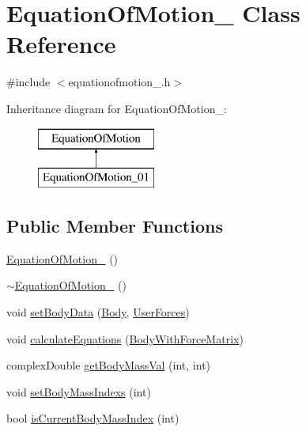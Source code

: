 \hypertarget{class_equation_of_motion__01}{\section{Equation\-Of\-Motion\-\_ Class Reference}
\label{class_equation_of_motion__01}
}


{\ttfamily \#include $<$equationofmotion\-\_.\-h$>$}

Inheritance diagram for Equation\-Of\-Motion\-\_\-:\begin{figure}[H]
\begin{center}
\leavevmode
\includegraphics[height=2.000000cm]{class_equation_of_motion__01}
\end{center}
\end{figure}
\subsection*{Public Member Functions}
\begin{DoxyCompactItemize}
\item 
\hyperlink{class_equation_of_motion__01_aeb61f23820f4598eece331449e34643f}{Equation\-Of\-Motion\-\_} ()
\item 
\hyperlink{class_equation_of_motion__01_ae771afba4d9d3b258008493413d0a3a2}{$\sim$\-Equation\-Of\-Motion\-\_} ()
\item 
void \hyperlink{class_equation_of_motion__01_a97581ef832e495feda5c7f91a30bb8c8}{set\-Body\-Data} (\hyperlink{class_body}{Body}, \hyperlink{class_user_forces}{User\-Forces})
\item 
void \hyperlink{class_equation_of_motion__01_a5f38bbfdb6fde4267260216d49b01416}{calculate\-Equations} (\hyperlink{class_body_with_force_matrix}{Body\-With\-Force\-Matrix})
\item 
complex\-Double \hyperlink{class_equation_of_motion__01_a8d21abea0294b0631e5bcbb025a1912d}{get\-Body\-Mass\-Val} (int, int)
\item 
void \hyperlink{class_equation_of_motion__01_a2bd0fd9e562d494c9481f538f7661b1e}{set\-Body\-Mass\-Indexs} (int)
\item 
bool \hyperlink{class_equation_of_motion__01_a69f34f20a208c4b180e24a8aea815fd4}{is\-Current\-Body\-Mass\-Index} (int)
\end{DoxyCompactItemize}
